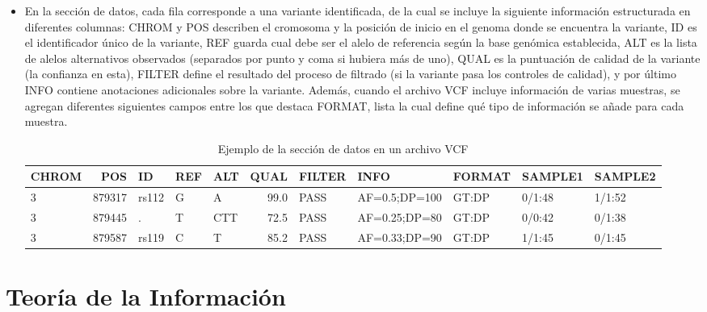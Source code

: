 \documentclass[11pt,spanish,listoffigures,listoftables]{tfgetsinf}
\begin{document}
\begin{itemize}
   \item En la sección de datos, cada fila corresponde a una variante identificada, de la cual se incluye la siguiente información estructurada en diferentes columnas: CHROM y POS describen el cromosoma y la posición de inicio en el genoma donde se encuentra la variante, ID es el identificador único de la variante, REF guarda cual debe ser el alelo de referencia según la base genómica establecida, ALT es la lista de alelos alternativos observados (separados por punto y coma si hubiera más de uno), QUAL es la puntuación de calidad de la variante (la confianza en esta), FILTER define el resultado del proceso de filtrado (si la variante pasa los controles de calidad), y por último INFO contiene anotaciones adicionales sobre la variante\cite{EMB}. Además, cuando el archivo VCF incluye información de varias muestras, se agregan diferentes siguientes campos entre los que destaca FORMAT, lista la cual define qué tipo de información se añade para cada muestra. 
      \begin{table}[H]
         \centering
         \caption{Ejemplo de la sección de datos en un archivo VCF}
         \begin{adjustbox}{width=\textwidth}
         \begin{tabular}{|l|r|l|l|l|r|l|l|l|l|l|}
         \hline
         \textbf{CHROM} & \textbf{POS} & \textbf{ID} & \textbf{REF} & \textbf{ALT} & \textbf{QUAL} & \textbf{FILTER} & \textbf{INFO} & \textbf{FORMAT} & \textbf{SAMPLE1} & \textbf{SAMPLE2} \\
         \hline
         3 & 879317 & rs112 & G & A & 99.0 & PASS & AF=0.5;DP=100 & GT:DP & 0/1:48 & 1/1:52 \\
         3 & 879445 & . & T & CTT & 72.5 & PASS & AF=0.25;DP=80 & GT:DP & 0/0:42 & 0/1:38 \\
         3 & 879587 & rs119 & C & T & 85.2 & PASS & AF=0.33;DP=90 & GT:DP & 1/1:45 & 0/1:45 \\
         \hline
         \end{tabular}
         \end{adjustbox}
         \label{tabla:ejemploVCF}
      \end{table}
      
      
      
\end{itemize}



\section{Teoría de la Información}
\end{document}

